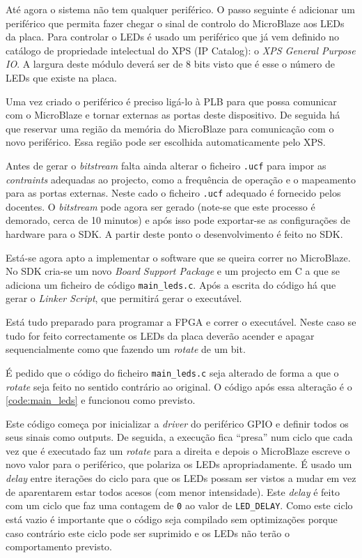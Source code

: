 \documentclass[a4paper]{article}
\begin{document}
Até agora o sistema não tem qualquer periférico. O passo seguinte é adicionar um periférico que permita fazer chegar o sinal de controlo do MicroBlaze aos LEDs da placa. Para controlar o LEDs é usado um periférico que já vem definido no catálogo de propriedade intelectual do XPS (IP Catalog): o \textit{XPS General Purpose IO}. A largura deste módulo deverá ser de 8 bits visto que é esse o número de LEDs que existe na placa.

Uma vez criado o periférico é preciso ligá-lo à PLB para que possa comunicar com o MicroBlaze e tornar externas as portas deste dispositivo. De seguida há que reservar uma região da memória do MicroBlaze para comunicação com o novo periférico. Essa região pode ser escolhida automaticamente pelo XPS.

Antes de gerar o \textit{bitstream} falta ainda alterar o ficheiro \texttt{.ucf} para impor as \textit{contraints} adequadas ao projecto, como a frequência de operação e o mapeamento para as portas externas. Neste cado o ficheiro \texttt{.ucf} adequado é fornecido pelos docentes. O \textit{bitstream} pode agora ser gerado (note-se que este processo é demorado, cerca de 10 minutos) e após isso pode exportar-se as configurações de hardware para o SDK. A partir deste ponto o desenvolvimento é feito no SDK.

Está-se agora apto a implementar o software que se queira correr no MicroBlaze. No SDK cria-se um novo \textit{Board Support Package} e um projecto em C a que se adiciona um ficheiro de código \texttt{main\_leds.c}. Após a escrita do código há que gerar o \textit{Linker Script}, que permitirá gerar o executável.

Está tudo preparado para programar a FPGA e correr o executável. Neste caso se tudo for feito correctamente os LEDs da placa deverão acender e apagar sequencialmente como que fazendo um \textit{rotate} de um bit.



É pedido que o código do ficheiro \texttt{main\_leds.c} seja alterado de forma a que o \textit{rotate} seja feito no sentido contrário ao original. O código após essa alteração é o \autoref{code:main_leds} e funcionou como previsto.

Este código começa por inicializar a \textit{driver} do periférico GPIO e definir todos os seus sinais como outputs. De seguida, a execução fica ``presa'' num ciclo que cada vez que é executado faz um \textit{rotate} para a direita e depois o MicroBlaze escreve o novo valor para o periférico, que polariza os LEDs apropriadamente. É usado um \textit{delay} entre iterações do ciclo para que os LEDs possam ser vistos a mudar em vez de aparentarem estar todos acesos (com menor intensidade). Este \textit{delay} é feito com um ciclo que faz uma contagem de \texttt{0} ao valor de \texttt{LED\_DELAY}. Como este ciclo está vazio é importante que o código seja compilado sem optimizações porque caso contrário este ciclo pode ser suprimido e os LEDs não terão o comportamento previsto.
\end{document}
